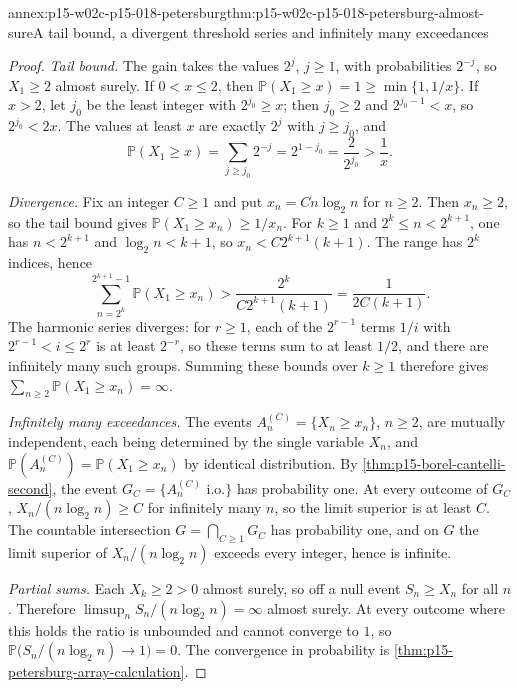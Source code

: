 \begin{annexitem}{annex:p15-w02c-p15-018-petersburg}{thm:p15-w02c-p15-018-petersburg-almost-sure}{A tail bound, a divergent threshold series and infinitely many exceedances}
\begin{proof}
\emph{Tail bound.} The gain takes the values \(2^j\), \(j\geq1\),
with probabilities \(2^{-j}\), so \(X_1\geq2\) almost surely. If
\(0<x\leq2\), then \(\mathbb P(X_1\geq x)=1\geq\min\{1,1/x\}\). If
\(x>2\), let \(j_0\) be the least integer with \(2^{j_0}\geq x\); then
\(j_0\geq2\) and \(2^{j_0-1}<x\), so \(2^{j_0}<2x\). The values at
least \(x\) are exactly \(2^j\) with \(j\geq j_0\), and
\[
 \mathbb P(X_1\geq x)=\sum_{j\geq j_0}2^{-j}=2^{1-j_0}
   =\frac2{2^{j_0}}>\frac1x .
\]

\emph{Divergence.} Fix an integer \(C\geq1\) and put
\(x_n=Cn\log_2n\) for \(n\geq2\). Then \(x_n\geq2\), so the tail bound
gives \(\mathbb P(X_1\geq x_n)\geq1/x_n\). For \(k\geq1\) and
\(2^k\leq n<2^{k+1}\), one has \(n<2^{k+1}\) and \(\log_2n<k+1\), so
\(x_n<C2^{k+1}(k+1)\). The range has \(2^k\) indices, hence
\[
 \sum_{n=2^k}^{2^{k+1}-1}\mathbb P(X_1\geq x_n)
   >\frac{2^k}{C2^{k+1}(k+1)}=\frac1{2C(k+1)} .
\]
The harmonic series diverges: for \(r\geq1\), each of the \(2^{r-1}\)
terms \(1/i\) with \(2^{r-1}<i\leq2^r\) is at least \(2^{-r}\), so these
terms sum to at least \(1/2\), and there are infinitely many such
groups. Summing these bounds over \(k\geq1\) therefore gives
\(\sum_{n\geq2}\mathbb P(X_1\geq x_n)=\infty\).

\emph{Infinitely many exceedances.} The events
\(A_n^{(C)}=\{X_n\geq x_n\}\), \(n\geq2\), are mutually independent,
each being determined by the single variable \(X_n\), and
\(\mathbb P(A_n^{(C)})=\mathbb P(X_1\geq x_n)\) by identical
distribution. By \cref{thm:p15-borel-cantelli-second}, the event
\(G_C=\{A_n^{(C)}\text{ i.o.}\}\) has probability one. At every outcome
of \(G_C\), \(X_n/(n\log_2n)\geq C\) for infinitely many \(n\), so the
limit superior is at least \(C\). The countable intersection
\(G=\bigcap_{C\geq1}G_C\) has probability one, and on \(G\) the limit
superior of \(X_n/(n\log_2n)\) exceeds every integer, hence is infinite.

\emph{Partial sums.} Each \(X_k\geq2>0\) almost surely, so off a null
event \(S_n\geq X_n\) for all \(n\). Therefore
\(\limsup_nS_n/(n\log_2n)=\infty\) almost surely. At every outcome
where this holds the ratio is unbounded and cannot converge to \(1\),
so \(\mathbb P\bigl(S_n/(n\log_2n)\to1\bigr)=0\). The convergence in
probability is \cref{thm:p15-petersburg-array-calculation}.


\end{proof}
\end{annexitem}
